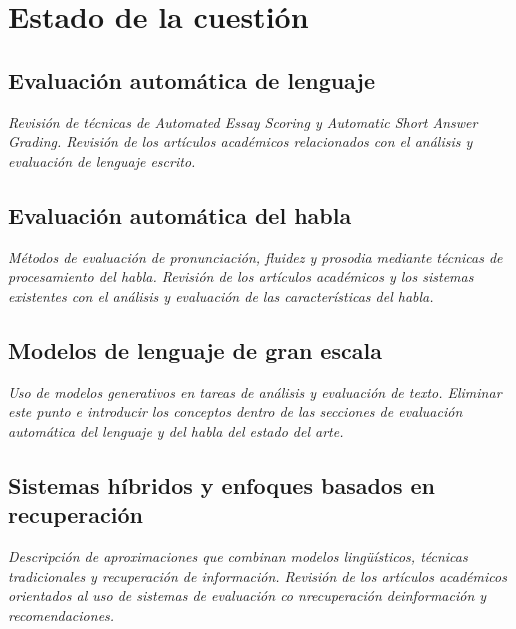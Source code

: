 \chapter{Estado de la cuestión}

\section{Evaluación automática de lenguaje}
\textit{Revisión de técnicas de Automated Essay Scoring y Automatic Short Answer Grading. Revisión de los artículos académicos relacionados con el análisis y evaluación de lenguaje escrito.}

\section{Evaluación automática del habla}
\textit{Métodos de evaluación de pronunciación, fluidez y prosodia mediante técnicas de procesamiento del habla. Revisión de los artículos académicos y los sistemas existentes con el análisis y evaluación de las características del habla.}
\section{Modelos de lenguaje de gran escala}
\textit{Uso de modelos generativos en tareas de análisis y evaluación de texto. Eliminar este punto e introducir los conceptos dentro de las secciones de evaluación automática del lenguaje y del habla del estado del arte.}

\section{Sistemas híbridos y enfoques basados en recuperación}
\textit{Descripción de aproximaciones que combinan modelos lingüísticos, técnicas tradicionales y recuperación de información. Revisión de los artículos académicos orientados al uso de sistemas de evaluación co nrecuperación deinformación y recomendaciones.}